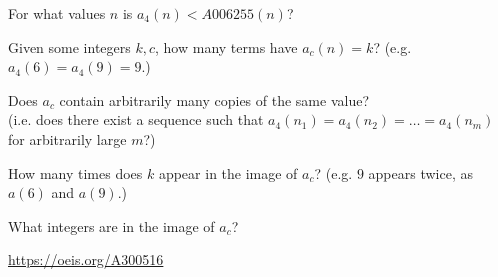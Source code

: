 \documentclass{article}
\begin{document}
\begin{related}
  \item For what values $n$ is $a_4(n) < A006255(n)$?
  \item Given some integers $k, c$, how many terms have $a_c(n) = k$?
    (e.g. $a_4(6) = a_4(9) = 9$.)
  \item Does $a_c$ contain arbitrarily many copies of the same value? \\
    (i.e. does there exist a sequence such that
    $a_4(n_1) = a_4(n_2) = \hdots = a_4(n_m)$ for arbitrarily large $m$?)
  \item How many times does $k$ appear in the image of $a_c$?
    (e.g. $9$ appears twice, as $a(6)$ and $a(9)$.)
  \item What integers are in the image of $a_c$?
\end{related}

\begin{references}
  \item \url{https://oeis.org/A300516}
\end{references}
\end{document}
